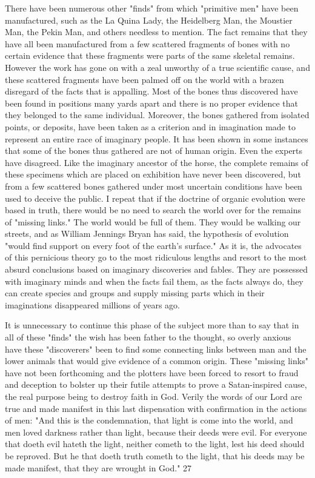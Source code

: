There have been numerous other "finds" from which "primitive men" have been
manufactured, such as the La Quina Lady, the Heidelberg Man, the Moustier Man, the Pekin
Man, and others needless to mention. The fact remains that they have all been manufactured
from a few scattered fragments of bones with no certain evidence that these fragments were
parts of the same skeletal remains. However the work has gone on with a zeal unworthy of a
true scientific cause, and these scattered fragments have been palmed off on the world with a
brazen disregard of the facts that is appalling. Most of the bones thus discovered have been
found in positions many yards apart and there is no proper evidence that they belonged to the
same individual. Moreover, the bones gathered from isolated points, or deposits, have been
taken as a criterion and in imagination made to represent an entire race of imaginary people.
It has been shown in some instances that some of the bones thus gathered are not of human
origin. Even the experts have disagreed. Like the imaginary ancestor of the horse, the
complete remains of these specimens which are placed on exhibition have never been
discovered, but from a few scattered bones gathered under most uncertain conditions have
been used to deceive the public. I repeat that if the doctrine of organic evolution were based
in truth, there would be no need to search the world over for the remains of "missing links."
The world would be full of them. They would be walking our streets, and as William
Jennings Bryan has said, the hypothesis of evolution "would find support on every foot of the
earth's surface." As it is, the advocates of this pernicious theory go to the most ridiculous
lengths and resort to the most absurd conclusions based on imaginary discoveries and fables.
They are possessed with imaginary minds and when the facts fail them, as the facts always
do, they can create species and groups and supply missing parts which in their imaginations
disappeared millions of years ago.

It is unnecessary to continue this phase of the subject more than to say that in all of these
"finds" the wish has been father to the thought, so overly anxious have these "discoverers"
been to find some connecting links between man and the lower animals that would give
evidence of a common origin. These "missing links" have not been forthcoming and the
plotters have been forced to resort to fraud and deception to bolster up their futile attempts to
prove a Satan-inspired cause, the real purpose being to destroy faith in God. Verily the words
of our Lord are true and made manifest in this last dispensation with confirmation in the
actions of men: "And this is the condemnation, that light is come into the world, and men
loved darkness rather than light, because their deeds were evil. For everyone that doeth evil
hateth the light, neither cometh to the light, lest his deed should be reproved. But he that
doeth truth cometh to the light, that his deeds may be made manifest, that they are wrought in
God." 27

